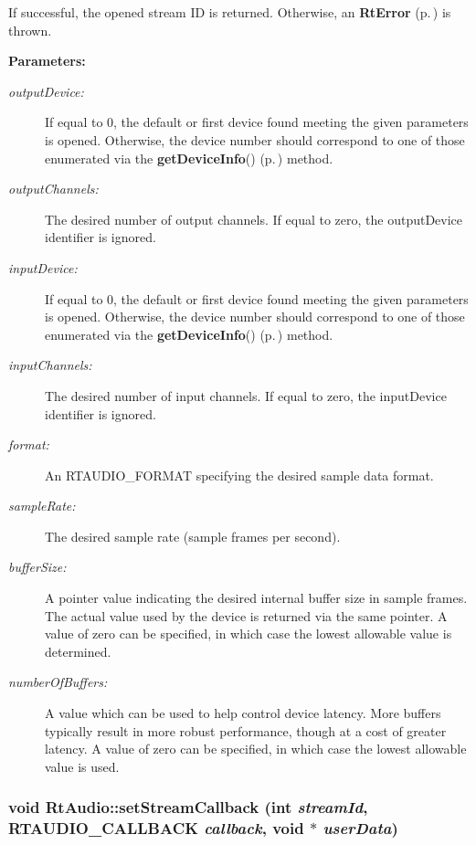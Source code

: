 If successful, the opened stream ID is returned. Otherwise, an {\bf Rt\-Error} {\rm (p.\,\pageref{classRtError})} is thrown.\begin{Desc}
\item[{\bf Parameters: }]\par
\begin{description}
\item[
{\em output\-Device:}]If equal to 0, the default or first device found meeting the given parameters is opened. Otherwise, the device number should correspond to one of those enumerated via the {\bf get\-Device\-Info}() {\rm (p.\,\pageref{classRtAudio_a7})} method. \item[
{\em output\-Channels:}]The desired number of output channels. If equal to zero, the output\-Device identifier is ignored. \item[
{\em input\-Device:}]If equal to 0, the default or first device found meeting the given parameters is opened. Otherwise, the device number should correspond to one of those enumerated via the {\bf get\-Device\-Info}() {\rm (p.\,\pageref{classRtAudio_a7})} method. \item[
{\em input\-Channels:}]The desired number of input channels. If equal to zero, the input\-Device identifier is ignored. \item[
{\em format:}]An RTAUDIO\_\-FORMAT specifying the desired sample data format. \item[
{\em sample\-Rate:}]The desired sample rate (sample frames per second). \item[
{\em buffer\-Size:}]A pointer value indicating the desired internal buffer size in sample frames. The actual value used by the device is returned via the same pointer. A value of zero can be specified, in which case the lowest allowable value is determined. \item[
{\em number\-Of\-Buffers:}]A value which can be used to help control device latency. More buffers typically result in more robust performance, though at a cost of greater latency. A value of zero can be specified, in which case the lowest allowable value is used. \end{description}
\end{Desc}
\subsubsection{\setlength{\rightskip}{0pt plus 5cm}void Rt\-Audio::set\-Stream\-Callback (int {\em stream\-Id}, {\bf RTAUDIO\_\-CALLBACK} {\em callback}, void $\ast$ {\em user\-Data})}\label{classRtAudio_a4}


